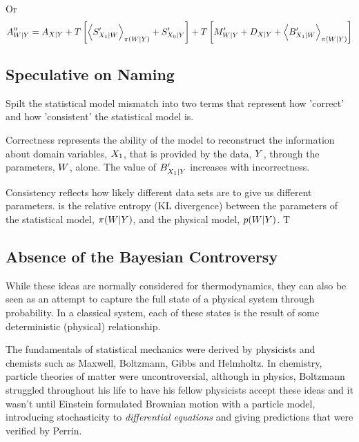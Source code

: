 \documentclass[]{article}
\begin{document}
Or 
\[
A^{\prime\prime}_{W|Y} = A_{X|Y} + T\left[\left\langle S^\prime_{X_1 | W} \right\rangle_{\pi(W | Y)} + S^\prime_{X_0|Y}\right]  + T\left[M^\prime_{W|Y} + D_{X|Y} + \left\langle B^\prime_{X_1 | W} \right\rangle_{\pi(W | Y)}\right]
\]

\subsection{Speculative on Naming}

Spilt the statistical model mismatch into two terms that represent how
'correct' and how 'consistent' the statistical model is.

Correctness represents the ability of the model to reconstruct the
information about domain variables, \(X_1\), that is
provided by the data, \(Y\), through the parameters,
\(W\), alone. The value of
\(B^\prime_{X_1|Y}\) increases with
incorrectness.

Consistency reflects how likely different data sets are to give us
different parameters. is the relative entropy (KL divergence) between
the parameters of the statistical model,
\(\pi(W|Y)\), and the physical model,
\(p(W|Y)\). T

\subsection{Absence of the Bayesian
Controversy}\label{absence-of-the-bayesian-controversy}

While these ideas are normally considered for thermodynamics, they can
also be seen as an attempt to capture the full state of a physical
system through probability. In a classical system, each of these states
is the result of some deterministic (physical) relationship.

The fundamentals of statistical mechanics were derived by physicists and
chemists such as Maxwell, Boltzmann, Gibbs and Helmholtz. In chemistry,
particle theories of matter were uncontroversial, although in physics,
Boltzmann struggled throughout his life to have his fellow physicists
accept these ideas and it wasn't until Einstein formulated Brownian
motion with a particle model\cite{Einstein-brownian05}, introducing
stochasticity to \emph{differential equations} and giving predictions
that were verified by Perrin\cite{Perrin-brownian10}.
\end{document}
